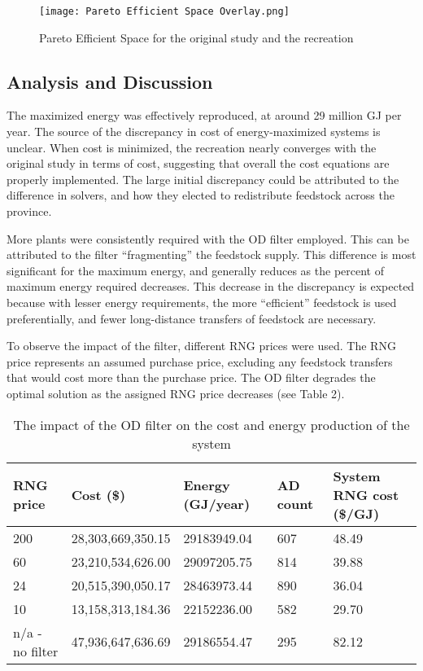 \documentclass[12pt]{article}
\begin{document}
\begin{figure}[H]
  \centering
  \texttt{[image: Pareto Efficient Space Overlay.png]}
  \caption{Pareto Efficient Space for the original study and the recreation}
  \label{fig:pareto_curve}
\end{figure}

\subsection{Analysis and Discussion}
The maximized energy was effectively reproduced, at around 29 million GJ per year. The source of the discrepancy in cost of energy-maximized systems is unclear. When cost is minimized, the recreation nearly converges with the original study in terms of cost, suggesting that overall the cost equations are properly implemented. The large initial discrepancy could be attributed to the difference in solvers, and how they elected to redistribute feedstock across the province. 

More plants were consistently required with the OD filter employed. This can be attributed to the filter “fragmenting” the feedstock supply. This difference is most significant for the maximum energy, and generally reduces as the percent of maximum energy required decreases. This decrease in the discrepancy is expected because with lesser energy requirements, the more “efficient” feedstock is used preferentially, and fewer long-distance transfers of feedstock are necessary. 

To observe the impact of the filter, different RNG prices were used. The RNG price represents an assumed purchase price, excluding any feedstock transfers that would cost more than the purchase price. The OD filter degrades the optimal solution as the assigned RNG price decreases (see Table 2).

\begin{table}[h]
  \centering
  \begin{tabular}{|p{3cm} | p{3cm} | p{3cm}| p{3cm}| p{3cm}|}
  \hline
  \rowcolor{gray!30}
  RNG price & Cost (\$) & Energy (GJ/year) & AD count & System RNG cost (\$/GJ) \\ \hline
  200 & 28,303,669,350.15 & 29183949.04 & 607 & 48.49 \\ \hline
  60 & 23,210,534,626.00 & 29097205.75 & 814 & 39.88 \\ \hline
  24 & 20,515,390,050.17 & 28463973.44 & 890 & 36.04 \\ \hline
  10 & 13,158,313,184.36 & 22152236.00 & 582 & 29.70 \\ \hline
  n/a - no filter & 47,936,647,636.69 & 29186554.47 & 295 & 82.12 \\ \hline
  \end{tabular}
  \caption{The impact of the OD filter on the cost and energy production of the system}
\end{table}
\end{document}
